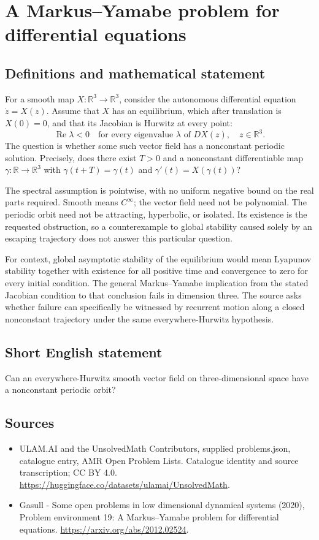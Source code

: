 \documentclass[11pt,a4paper]{article}
\begin{document}
\section*{A Markus–Yamabe problem for differential equations}\label{statement}

\subsection{Definitions and mathematical statement}
For a smooth map $X:\mathbb R^3\to\mathbb R^3$, consider the autonomous
differential equation $\dot z=X(z)$. Assume that $X$ has an equilibrium,
which after translation is $X(0)=0$, and that its Jacobian is Hurwitz at
every point:
\[
 \operatorname{Re}\lambda<0\quad
 \text{for every eigenvalue }\lambda\text{ of }DX(z),
 \quad z\in\mathbb R^3.
\]
The question is whether some such vector field has a nonconstant periodic
solution. Precisely, does there exist $T>0$ and a nonconstant differentiable
map $\gamma:\mathbb R\to\mathbb R^3$ with
$\gamma(t+T)=\gamma(t)$ and $\gamma'(t)=X(\gamma(t))$?

The spectral assumption is pointwise, with no uniform negative bound on
the real parts required. Smooth means $C^\infty$; the vector field need
not be polynomial. The periodic orbit need not be attracting, hyperbolic,
or isolated. Its existence is the requested obstruction, so a counterexample
to global stability caused solely by an escaping trajectory does not
answer this particular question.

For context, global asymptotic stability of the equilibrium would mean
Lyapunov stability together with existence for all positive time and
convergence to zero for every initial condition. The general
Markus–Yamabe implication from the stated Jacobian condition to that
conclusion fails in dimension three. The source asks whether failure can
specifically be witnessed by recurrent motion along a closed nonconstant
trajectory under the same everywhere-Hurwitz hypothesis.
\subsection{Short English statement}
Can an everywhere-Hurwitz smooth vector field on three-dimensional space have a nonconstant periodic orbit?
\subsection{Sources}
\begin{itemize}
\item[S1] ULAM.AI and the UnsolvedMath Contributors, supplied problems.json, catalogue entry, AMR Open Problem Lists. Catalogue identity and source transcription; CC BY 4.0.
\url{https://huggingface.co/datasets/ulamai/UnsolvedMath}.
\item[S2] Gasull - Some open problems in low dimensional dynamical systems (2020), Problem environment 19: A Markus–Yamabe problem for differential equations. 
\url{https://arxiv.org/abs/2012.02524}.
\end{itemize}
\end{document}
